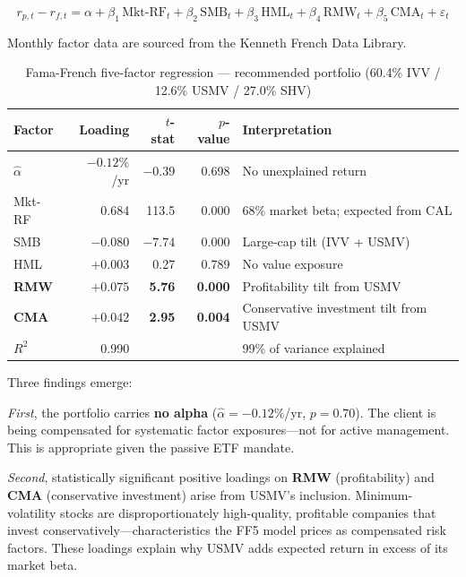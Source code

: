 \documentclass[12pt, letterpaper]{article}
\begin{document}
\begin{equation}
  r_{p,t} - r_{f,t} = \alpha + \beta_1\,\text{Mkt-RF}_t
                               + \beta_2\,\text{SMB}_t
                               + \beta_3\,\text{HML}_t
                               + \beta_4\,\text{RMW}_t
                               + \beta_5\,\text{CMA}_t
                               + \varepsilon_t
  \label{eq:ff5}
\end{equation}

Monthly factor data are sourced from the Kenneth French Data Library.

\begin{table}[H]
  \centering
  \caption{Fama-French five-factor regression --- recommended portfolio
           (60.4\% IVV / 12.6\% USMV / 27.0\% SHV)}
  \label{tab:ff5}
  \begin{tabular}{lrrrp{5.5cm}}
    \toprule
    \textbf{Factor} & \textbf{Loading} & \textbf{$t$-stat} & \textbf{$p$-value}
                    & \textbf{Interpretation} \\
    \midrule
    $\hat{\alpha}$ & $-0.12\%$/yr & $-0.39$ & 0.698 & No unexplained return \\
    Mkt-RF         &  0.684       & 113.5   & 0.000 & 68\% market beta; expected from CAL \\
    SMB            & $-0.080$     & $-7.74$ & 0.000 & Large-cap tilt (IVV + USMV) \\
    HML            & $+0.003$     &  0.27   & 0.789 & No value exposure \\
    \textbf{RMW}   & \textbf{$+0.075$} & \textbf{5.76} & \textbf{0.000} & Profitability tilt from USMV \\
    \textbf{CMA}   & \textbf{$+0.042$} & \textbf{2.95} & \textbf{0.004} & Conservative investment tilt from USMV \\
    \midrule
    $R^2$          & 0.990        &         &       & 99\% of variance explained \\
    \bottomrule
  \end{tabular}
\end{table}

Three findings emerge:

\textit{First}, the portfolio carries \textbf{no alpha} ($\hat{\alpha} = -0.12\%$/yr, $p=0.70$).
The client is being compensated for systematic factor exposures---not for active management.
This is appropriate given the passive ETF mandate.

\textit{Second}, statistically significant positive loadings on \textbf{RMW} (profitability)
and \textbf{CMA} (conservative investment) arise from USMV's inclusion.
Minimum-volatility stocks are disproportionately high-quality, profitable companies
that invest conservatively---characteristics the FF5 model prices as compensated risk factors.
These loadings explain why USMV adds expected return in excess of its market beta.
\end{document}
